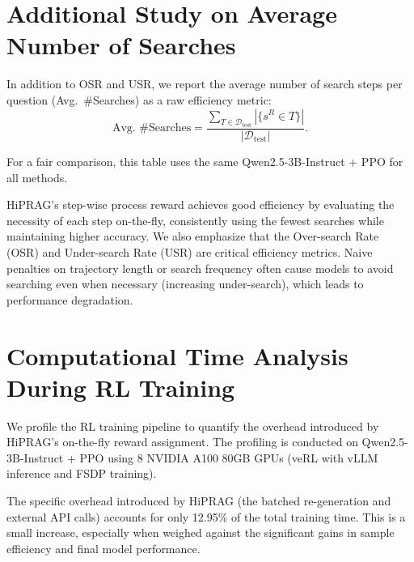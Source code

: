 \documentclass{article}
\begin{document}
\section{Additional Study on Average Number of Searches}
In addition to OSR and USR, we report the average number of search steps per question (Avg.~\#Searches) as a raw efficiency metric:
\begin{equation}
\label{eq:avg_searches}
\text{Avg.~\#Searches} = \frac{\sum_{T \in \mathcal{D}_{\text{test}}} \left|\{ s^R \in T \}\right|}{|\mathcal{D}_{\text{test}}|}.
\end{equation}

For a fair comparison, this table uses the same Qwen2.5-3B-Instruct + PPO for all methods.


HiPRAG's step-wise process reward achieves good efficiency by evaluating the necessity of each step on-the-fly, consistently using the fewest searches while maintaining higher accuracy. We also emphasize that the Over-search Rate (OSR) and Under-search Rate (USR) are critical efficiency metrics. Naive penalties on trajectory length or search frequency often cause models to avoid searching even when necessary (increasing under-search), which leads to performance degradation.

\section{Computational Time Analysis During RL Training}
We profile the RL training pipeline to quantify the overhead introduced by HiPRAG's on-the-fly reward assignment. The profiling is conducted on Qwen2.5-3B-Instruct + PPO using 8 NVIDIA A100 80GB GPUs (veRL with vLLM inference and FSDP training).


The specific overhead introduced by HiPRAG (the batched re-generation and external API calls) accounts for only 12.95\% of the total training time. This is a small increase, especially when weighed against the significant gains in sample efficiency and final model performance.
\end{document}
